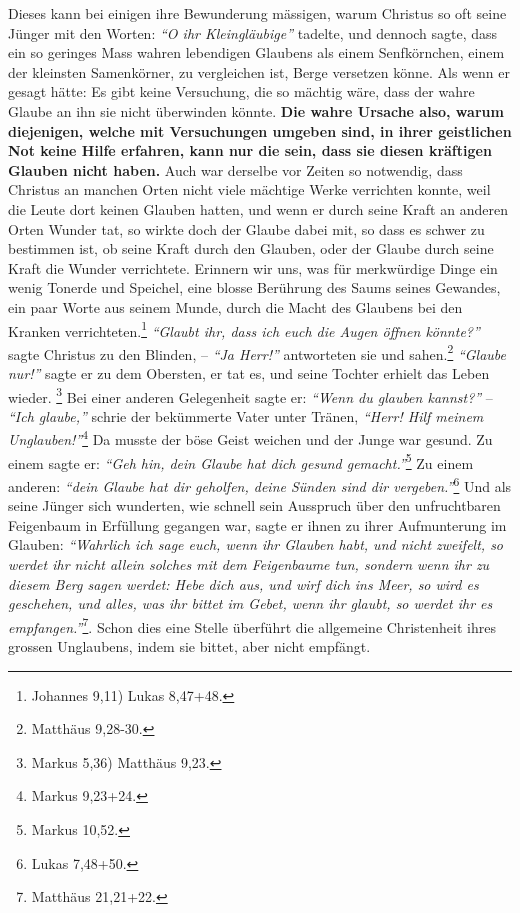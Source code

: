 Dieses kann bei einigen ihre Bewunderung mässigen, warum Christus so oft seine
Jünger mit den Worten:
\textit{"`O ihr Kleingläubige"'} tadelte, und dennoch sagte,
dass ein so geringes Mass wahren lebendigen Glaubens als einem Senfkörnchen,
einem der kleinsten Samenkörner, zu vergleichen ist, Berge versetzen könne. Als
wenn er gesagt hätte: Es gibt keine Versuchung, die so mächtig wäre, dass der
wahre Glaube an ihn sie nicht überwinden könnte. \textbf{Die wahre Ursache also,
warum
diejenigen, welche mit Versuchungen umgeben sind, in ihrer geistlichen Not
keine Hilfe erfahren, kann nur die sein, dass sie diesen kräftigen Glauben nicht
haben.} Auch war derselbe vor Zeiten so notwendig,
dass Christus an manchen
Orten nicht viele mächtige Werke verrichten konnte, weil die Leute dort
keinen Glauben hatten, und wenn er durch seine Kraft an anderen Orten Wunder
tat, so wirkte doch der Glaube dabei mit, so dass es schwer zu bestimmen ist,
ob seine Kraft durch den Glauben, oder der Glaube durch seine Kraft die Wunder
verrichtete. Erinnern wir uns, was für merkwürdige Dinge ein wenig Tonerde und
Speichel, eine blosse Berührung des Saums seines Gewandes, ein paar Worte aus
seinem Munde, durch die Macht des Glaubens bei den Kranken
verrichteten.\footnote{Johannes 9,11) Lukas 8,47+48.}
\textit{"`Glaubt ihr, dass ich euch die
Augen öffnen könnte?"'} sagte Christus zu den Blinden, -- \textit{"`Ja Herr!"'}
antworteten
sie und sahen.\footnote{Matthäus 9,28-30.}
\textit{"`Glaube nur!"'} sagte er zu dem
Obersten, er tat es, und seine Tochter erhielt das Leben wieder.
\footnote{Markus 5,36) Matthäus 9,23.}
Bei einer anderen Gelegenheit sagte er:
\textit{"`Wenn du glauben kannst?"'} --
\textit{"`Ich glaube,"'} schrie der bekümmerte Vater unter Tränen,
\textit{"`Herr! Hilf meinem Unglauben!"'}\footnote{Markus 9,23+24.}
Da musste der böse Geist weichen und der
Junge war gesund. Zu einem sagte er:
\textit{"`Geh hin, dein Glaube hat dich gesund gemacht."'}\footnote{Markus
10,52.}
Zu einem anderen: \textit{"`dein Glaube hat dir
geholfen, deine Sünden sind dir vergeben."'}\footnote{Lukas 7,48+50.}
Und als seine
Jünger sich wunderten, wie schnell sein Ausspruch über den unfruchtbaren
Feigenbaum in Erfüllung gegangen war, sagte er ihnen zu ihrer Aufmunterung im
Glauben:
\textit{"`Wahrlich ich sage euch, wenn ihr Glauben habt, und nicht zweifelt,
so werdet ihr nicht allein solches mit dem Feigenbaume tun, sondern wenn ihr zu
diesem Berg sagen werdet: Hebe dich aus, und wirf dich ins Meer, so wird es
geschehen, und alles, was ihr bittet im Gebet, wenn ihr glaubt, so werdet ihr
es empfangen."'}\footnote{Matthäus 21,21+22.}. Schon dies eine Stelle überführt die
allgemeine Christenheit ihres grossen
Unglaubens, indem sie bittet, aber nicht
empfängt.

